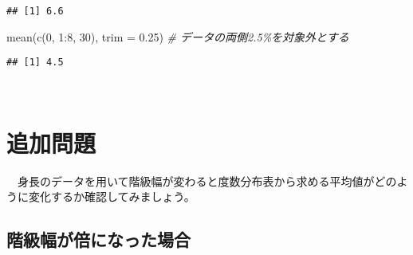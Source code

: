 \documentclass[
  12pt,
]{book}
\newenvironment{Shaded}{\begin{snugshade}}{\end{snugshade}}
\newcommand{\AttributeTok}[1]{\textcolor[rgb]{0.77,0.63,0.00}{#1}}
\newcommand{\CommentTok}[1]{\textcolor[rgb]{0.56,0.35,0.01}{\textit{#1}}}
\newcommand{\DecValTok}[1]{\textcolor[rgb]{0.00,0.00,0.81}{#1}}
\newcommand{\FloatTok}[1]{\textcolor[rgb]{0.00,0.00,0.81}{#1}}
\newcommand{\FunctionTok}[1]{\textcolor[rgb]{0.00,0.00,0.00}{#1}}
\newcommand{\NormalTok}[1]{#1}
\newcommand{\SpecialCharTok}[1]{\textcolor[rgb]{0.00,0.00,0.00}{#1}}
\begin{document}
\begin{verbatim}
## [1] 6.6
\end{verbatim}

\begin{Shaded}
\begin{Highlighting}[]
\FunctionTok{mean}\NormalTok{(}\FunctionTok{c}\NormalTok{(}\DecValTok{0}\NormalTok{, }\DecValTok{1}\SpecialCharTok{:}\DecValTok{8}\NormalTok{, }\DecValTok{30}\NormalTok{), }\AttributeTok{trim =} \FloatTok{0.25}\NormalTok{)  }\CommentTok{\# データの両側2.5\%を対象外とする}
\end{Highlighting}
\end{Shaded}

\begin{verbatim}
## [1] 4.5
\end{verbatim}

　

\hypertarget{ux8ffdux52a0ux554fux984c}{%
\section*{追加問題}\label{ux8ffdux52a0ux554fux984c}}

　身長のデータを用いて階級幅が変わると度数分布表から求める平均値がどのように変化するか確認してみましょう。

\hypertarget{ux968eux7d1aux5e45ux304cux500dux306bux306aux3063ux305fux5834ux5408}{%
\subsection*{階級幅が倍になった場合}\label{ux968eux7d1aux5e45ux304cux500dux306bux306aux3063ux305fux5834ux5408}}
\end{document}
